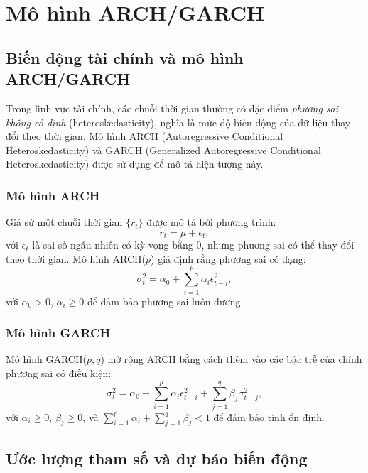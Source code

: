 \chapter{Mô hình ARCH/GARCH}

\section{Biến động tài chính và mô hình ARCH/GARCH}

Trong lĩnh vực tài chính, các chuỗi thời gian thường có đặc điểm \textit{phương sai không cố định} (heteroskedasticity), nghĩa là mức độ biến động của dữ liệu thay đổi theo thời gian. Mô hình ARCH (Autoregressive Conditional Heteroskedasticity) và GARCH (Generalized Autoregressive Conditional Heteroskedasticity) được sử dụng để mô tả hiện tượng này.

\subsection{Mô hình ARCH}
Giả sử một chuỗi thời gian $\{r_t\}$ được mô tả bởi phương trình:
\begin{equation}
    r_t = \mu + \epsilon_t,
\end{equation}
với $\epsilon_t$ là sai số ngẫu nhiên có kỳ vọng bằng 0, nhưng phương sai có thể thay đổi theo thời gian. Mô hình ARCH($p$) giả định rằng phương sai có dạng:
\begin{equation}
    \sigma_t^2 = \alpha_0 + \sum_{i=1}^{p} \alpha_i \epsilon_{t-i}^2,
\end{equation}
với $\alpha_0 > 0$, $\alpha_i \geq 0$ để đảm bảo phương sai luôn dương.

\subsection{Mô hình GARCH}
Mô hình GARCH($p, q$) mở rộng ARCH bằng cách thêm vào các bậc trễ của chính phương sai có điều kiện:
\begin{equation}
    \sigma_t^2 = \alpha_0 + \sum_{i=1}^{p} \alpha_i \epsilon_{t-i}^2 + \sum_{j=1}^{q} \beta_j \sigma_{t-j}^2,
\end{equation}
với $\alpha_i \geq 0$, $\beta_j \geq 0$, và $\sum_{i=1}^{p} \alpha_i + \sum_{j=1}^{q} \beta_j < 1$ để đảm bảo tính ổn định.

\section{Ước lượng tham số và dự báo biến động}

